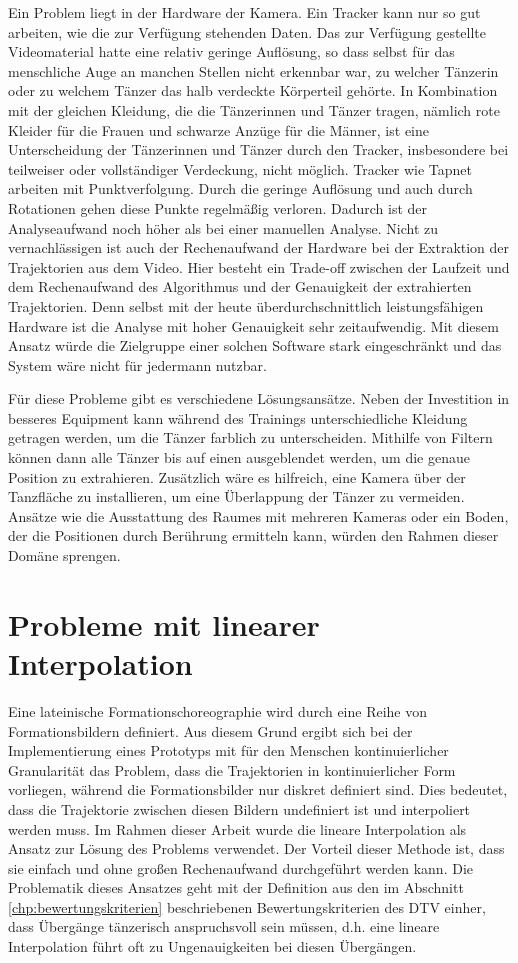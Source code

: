 \documentclass[
  ngerman,
  a4paper,  %
  twoside,  %
  bibliography=totoc,
  headsepline,
  cleardoublepage=empty,
  parskip=half,
  draft=false
]{scrbook}
\begin{document}
Ein Problem liegt in der Hardware der Kamera. Ein Tracker kann nur so gut arbeiten, wie die zur Verfügung stehenden Daten. Das zur Verfügung gestellte Videomaterial hatte eine relativ geringe Auflösung, so dass selbst für das menschliche Auge an manchen Stellen nicht erkennbar war, zu welcher Tänzerin oder zu welchem Tänzer das halb verdeckte Körperteil gehörte. In Kombination mit der gleichen Kleidung, die die Tänzerinnen und Tänzer tragen, nämlich rote Kleider für die Frauen und schwarze Anzüge für die Männer, ist eine Unterscheidung der Tänzerinnen und Tänzer durch den Tracker, insbesondere bei teilweiser oder vollständiger Verdeckung, nicht möglich. Tracker wie Tapnet arbeiten mit Punktverfolgung. Durch die geringe Auflösung und auch durch Rotationen gehen diese Punkte regelmäßig verloren. Dadurch ist der Analyseaufwand noch höher als bei einer manuellen Analyse. Nicht zu vernachlässigen ist auch der Rechenaufwand der Hardware bei der Extraktion der Trajektorien aus dem Video. Hier besteht ein Trade-off zwischen der Laufzeit und dem Rechenaufwand des Algorithmus und der Genauigkeit der extrahierten Trajektorien. Denn selbst mit der heute überdurchschnittlich leistungsfähigen Hardware ist die Analyse mit hoher Genauigkeit sehr zeitaufwendig. Mit diesem Ansatz würde die Zielgruppe einer solchen Software stark eingeschränkt und das System wäre nicht für jedermann nutzbar.

Für diese Probleme gibt es verschiedene Lösungsansätze. Neben der Investition in besseres Equipment kann während des Trainings unterschiedliche Kleidung getragen werden, um die Tänzer farblich zu unterscheiden. Mithilfe von Filtern können dann alle Tänzer bis auf einen ausgeblendet werden, um die genaue Position zu extrahieren. Zusätzlich wäre es hilfreich, eine Kamera über der Tanzfläche zu installieren, um eine Überlappung der Tänzer zu vermeiden. Ansätze wie die Ausstattung des Raumes mit mehreren Kameras oder ein Boden, der die Positionen durch Berührung ermitteln kann, würden den Rahmen dieser Domäne sprengen.

\section{Probleme mit linearer Interpolation}
Eine lateinische Formationschoreographie wird durch eine Reihe von Formationsbildern definiert. Aus diesem Grund ergibt sich bei der Implementierung eines Prototyps mit für den Menschen kontinuierlicher Granularität das Problem, dass die Trajektorien in kontinuierlicher Form vorliegen, während die Formationsbilder nur diskret definiert sind. Dies bedeutet, dass die Trajektorie zwischen diesen Bildern undefiniert ist und interpoliert werden muss. Im Rahmen dieser Arbeit wurde die lineare Interpolation als Ansatz zur Lösung des Problems verwendet. Der Vorteil dieser Methode ist, dass sie einfach und ohne großen Rechenaufwand durchgeführt werden kann. Die Problematik dieses Ansatzes geht mit der Definition aus den im Abschnitt \ref{chp:bewertungskriterien} beschriebenen Bewertungskriterien des DTV \cite{wertungsrichtlinien} einher, dass Übergänge tänzerisch anspruchsvoll sein müssen, d.h. eine lineare Interpolation führt oft zu Ungenauigkeiten bei diesen Übergängen.
\end{document}
